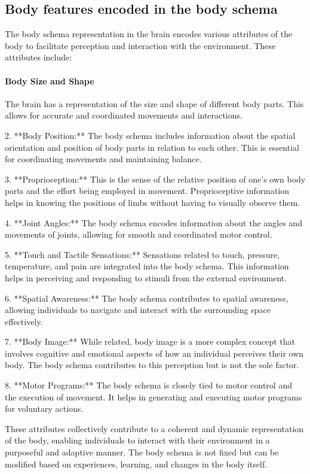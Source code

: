 \subsection{Body features encoded in the body schema}
The body schema representation in the brain encodes various attributes of the body to facilitate perception and interaction with the environment. These attributes include:

\paragraph*{Body Size and Shape} The brain has a representation of the size and shape of different body parts. This allows for accurate and coordinated movements and interactions.

2. **Body Position:** The body schema includes information about the spatial orientation and position of body parts in relation to each other. This is essential for coordinating movements and maintaining balance.

3. **Proprioception:** This is the sense of the relative position of one's own body parts and the effort being employed in movement. Proprioceptive information helps in knowing the positions of limbs without having to visually observe them.

4. **Joint Angles:** The body schema encodes information about the angles and movements of joints, allowing for smooth and coordinated motor control.

5. **Touch and Tactile Sensations:** Sensations related to touch, pressure, temperature, and pain are integrated into the body schema. This information helps in perceiving and responding to stimuli from the external environment.

6. **Spatial Awareness:** The body schema contributes to spatial awareness, allowing individuals to navigate and interact with the surrounding space effectively.

7. **Body Image:** While related, body image is a more complex concept that involves cognitive and emotional aspects of how an individual perceives their own body. The body schema contributes to this perception but is not the sole factor.

8. **Motor Programs:** The body schema is closely tied to motor control and the execution of movement. It helps in generating and executing motor programs for voluntary actions.

These attributes collectively contribute to a coherent and dynamic representation of the body, enabling individuals to interact with their environment in a purposeful and adaptive manner. The body schema is not fixed but can be modified based on experiences, learning, and changes in the body itself.



